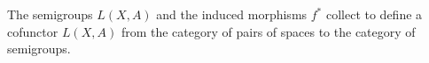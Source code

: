 The semigroups $L(X, A)$ and the induced morphisms $f^*$ collect to define a cofunctor $L(X, A)$ from the category of pairs of spaces to the category of semigroups.